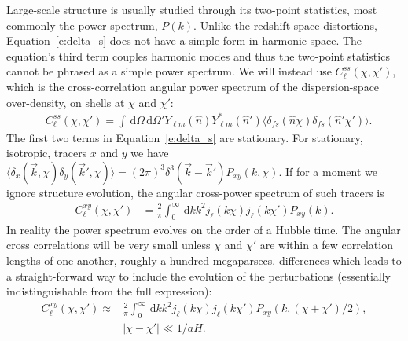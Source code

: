 \documentclass[twocolumn,prl,floatfix]{revtex4-1}
\newcommand{\ud}{\,\mathrm{d}}
\begin{document}
Large-scale structure is usually studied through its two-point statistics, most
commonly the power spectrum, $P(k)$.
Unlike the redshift-space distortions, Equation~\ref{e:delta_s} does not have a
simple form in harmonic space. The equation's third term couples harmonic modes
and thus the two-point statistics cannot be phrased as a simple power spectrum.
We will instead use $C^{ss}_\ell(\chi,\chi')$, which is
the cross-correlation angular power spectrum of the dispersion-space over-density,
on shells at $\chi$ and $\chi'$:
\begin{align}
    &C^{ss}_\ell(\chi, \chi') =
    \int\ud\Omega\ud\Omega' Y_{\ell m}(\hat n) Y^*_{\ell m}(\hat n')
    \langle \delta_{fs}(\hat n \chi) \delta_{fs}(\hat n' \chi')
        \rangle.
\end{align}
The first two terms in Equation~\ref{e:delta_s} are stationary. For stationary,
isotropic, tracers $x$ and $y$ we have 
$\langle \delta_x(\vec k, \chi) \delta_y(\vec k', \chi) \rangle = (2\pi)^3
\delta^3(\vec k - \vec k') P_{xy}(k, \chi)$.  If for a moment we ignore
structure evolution, the angular cross-power spectrum of such tracers is
\begin{align}
    C^{xy}_\ell(\chi,\chi')
    &= \frac{2}{\pi}
\int_0^\infty\ud k k^2 j_\ell(k\chi) j_{\ell}(k\chi')P_{xy}(k).
\end{align}
In reality the power spectrum evolves on the order of a Hubble time.
The angular cross correlations will be very small unless $\chi$ and $\chi'$ are
within a few correlation lengths of one another, roughly a hundred
megaparsecs.  differences which leads to a straight-forward way to include the evolution of
the perturbations (essentially indistinguishable from the full expression):
\begin{align}
    C^{xy}_\ell(\chi,\chi') \approx&
        \frac{2}{\pi}
        \int_0^\infty\ud k k^2
        j_\ell(k\chi) j_{\ell}(k\chi')
        P_{xy}(k,(\chi + \chi')/2),\nonumber \\
    &|\chi - \chi'| \ll 1/aH.
\end{align}
\end{document}
